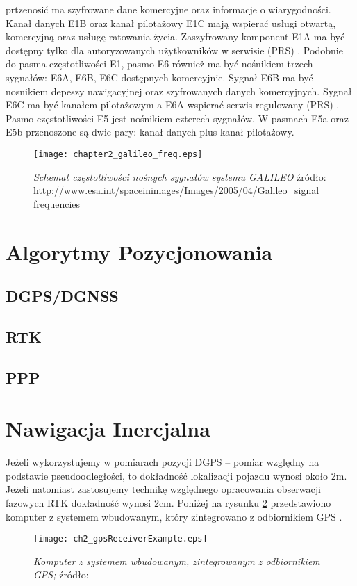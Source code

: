 prtzenosić ma szyfrowane dane komercyjne oraz informacje o wiarygodności. Kanał danych E1B oraz kanał pilotażowy E1C mają wspierać usługi otwartą, komercyjną oraz 
usługę ratowania życia. Zaszyfrowany komponent E1A ma być dostępny tylko dla autoryzowanych użytkowników w serwisie (PRS) \cite[][strona 387]{hofmann_gnss}.
Podobnie do pasma częstotliwości E1, pasmo E6 również ma być nośnikiem trzech sygnałów: E6A, E6B, E6C dostępnych komercyjnie. 
Sygnał E6B ma być nosnikiem depeszy nawigacyjnej oraz szyfrowanych danych komercyjnych. Sygnał E6C ma być kanałem pilotażowym a E6A wspierać serwis regulowany (PRS)
\cite[][strona 389]{hofmann_gnss}.
Pasmo częstotliwości E5 jest nośnikiem czterech sygnałów. W pasmach E5a oraz E5b przenoszone są dwie pary: kanał danych plus kanał pilotażowy.
\begin{figure}[H]
\centering
\texttt{[image: chapter2\_galileo\_freq.eps]}
\caption{\textit{Schemat częstotliwości nośnych sygnałów systemu GALILEO} źródło: \protect\url{http://www.esa.int/spaceinimages/Images/2005/04/Galileo_signal_frequencies}}
\label{fig:galileo_freq}
\end{figure}
\section{Algorytmy Pozycjonowania}

	\subsection{DGPS/DGNSS}
	\subsection{RTK}
	\subsection{PPP}
\section{Nawigacja Inercjalna}
\noindent
Jeżeli wykorzystujemy w pomiarach pozycji DGPS – pomiar względny na podstawie pseudoodległości,
to dokładność lokalizacji pojazdu wynosi około 2m. 
Jeżeli natomiast zastosujemy technikę względnego opracowania obserwacji fazowych RTK dokładność wynosi 2cm.
Poniżej na rysunku \ref{fig:ch2_gpsReceiverExample} przedstawiono komputer z systemem wbudowanym,
który zintegrowano z odbiornikiem GPS \cite{CCTA_951_958}.
\begin{figure}[H]
\centering
\texttt{[image: ch2\_gpsReceiverExample.eps]}
\caption{\textit{Komputer z systemem wbudowanym, zintegrowanym z odbiornikiem GPS;} źródło: \cite[][strona 952]{CCTA_951_958}}
\label{fig:ch2_gpsReceiverExample}
\end{figure}
\noindent
